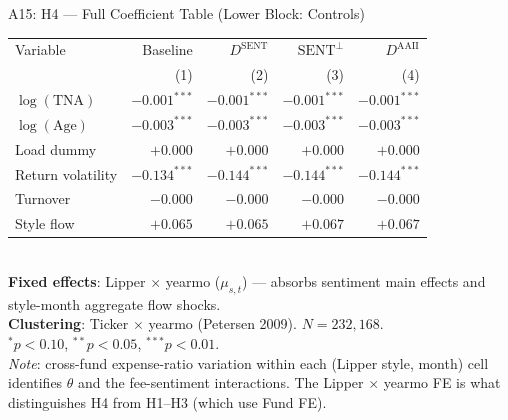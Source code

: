 \documentclass[10pt, aspectratio=169]{beamer}
\begin{document}
\begin{frame}{A15: H4 — Full Coefficient Table (Lower Block: Controls)}
  \scriptsize
  \setlength{\tabcolsep}{4pt}
  \begin{tabular}{@{}lrrrr@{}}
    \toprule
    Variable & Baseline & $D^{\text{SENT}}$ & $\text{SENT}^\perp$ & $D^{\text{AAII}}$ \\
    & (1) & (2) & (3) & (4) \\
    \midrule
    $\log(\text{TNA})$      & $-0.001^{***}$& $-0.001^{***}$& $-0.001^{***}$& $-0.001^{***}$ \\
    $\log(\text{Age})$      & $-0.003^{***}$& $-0.003^{***}$& $-0.003^{***}$& $-0.003^{***}$ \\
    Load dummy              & $+0.000$      & $+0.000$      & $+0.000$      & $+0.000$ \\
    Return volatility       & $-0.134^{***}$& $-0.144^{***}$& $-0.144^{***}$& $-0.144^{***}$ \\
    Turnover                & $-0.000$      & $-0.000$      & $-0.000$      & $-0.000$ \\
    Style flow              & $+0.065$      & $+0.065$      & $+0.067$      & $+0.067$ \\
    \bottomrule
  \end{tabular}
  \vspace{4pt}\\
  \footnotesize\textbf{Fixed effects}: Lipper $\times$ yearmo ($\mu_{s,t}$) — absorbs sentiment main effects
  and style-month aggregate flow shocks.\\
  \textbf{Clustering}: Ticker $\times$ yearmo (Petersen 2009). $N=232{,}168$.\\
  $^{*}p<0.10$, $^{**}p<0.05$, $^{***}p<0.01$.\\[4pt]
  \footnotesize\textit{Note}: cross-fund expense-ratio variation within each (Lipper style, month) cell identifies
  $\theta$ and the fee-sentiment interactions. The Lipper $\times$ yearmo FE is what distinguishes
  H4 from H1--H3 (which use Fund FE).
\end{frame}

\end{document}
